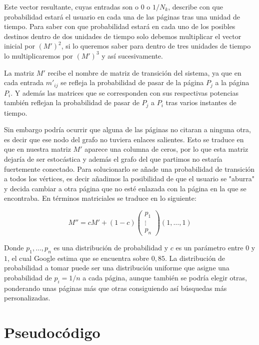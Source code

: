 \documentclass[size=a4, parskip=half, titlepage=false, toc=flat, toc=bib, 12pt]{scrartcl}
\theoremstyle{theorem-style}
\theoremstyle{definition-style}
\theoremstyle{remark-style}
\theoremstyle{example-style}
\theoremstyle{definition-style}
\theoremstyle{remark-style}
\begin{document}
Este vector resultante, cuyas entradas son o $0$ o $1/N_k$, describe con que probabilidad estará el usuario en cada una de las páginas tras una unidad de tiempo. Para saber con que probabilidad estará en cada uno de los posibles destinos dentro de dos unidades de tiempo solo debemos multiplicar el vector inicial por $(M')^2$, si lo queremos saber para dentro de tres unidades de tiempo lo multiplicaremos por $(M')^3$ y así sucesivamente.

La matriz $M'$ recibe el nombre de matriz de transición del sistema, ya que en cada entrada $m'_{ij}$ se refleja la probabilidad de pasar de la página $P_j$ a la página $P_i$. Y además las matrices que se corresponden con sus respectivas potencias también reflejan la probabilidad de pasar de $P_j$ a $P_i$ tras varios instantes de tiempo.

Sin embargo podría ocurrir que alguna de las páginas no citaran a ninguna otra, es decir que ese nodo del grafo no tuviera enlaces salientes. Esto se traduce en que en nuestra matriz $M'$ aparece una columna de ceros, por lo que esta matriz dejaría de ser estocástica y además el grafo del que partimos no estaría fuertemente conectado. Para solucionarlo se añade una probabilidad de transición a todos los vértices, es decir añadimos la posibilidad de que el usuario se "aburra" y decida cambiar a otra página que no esté enlazada con la página en la que se encontraba. En términos matriciales se traduce en lo siguiente:

$$M'' = cM' + (1-c)\begin{pmatrix}
p_1 \\
\vdots \\
p_n \end{pmatrix} (1, \dots, 1)$$

Donde $p_1, \dots , p_n$ es una distribución de probabilidad y $c$ es un parámetro entre $0$ y $1$, el cual Google estima que se encuentra sobre $0,85$. La distribución de probabilidad a tomar puede ser una distribución uniforme que asigne una probabilidad de $p_i = 1/n$ a cada página, aunque también se podría elegir otras, ponderando unas páginas más que otras consiguiendo así búsquedas más personalizadas.



\newpage

\section{Pseudocódigo}
\end{document}
